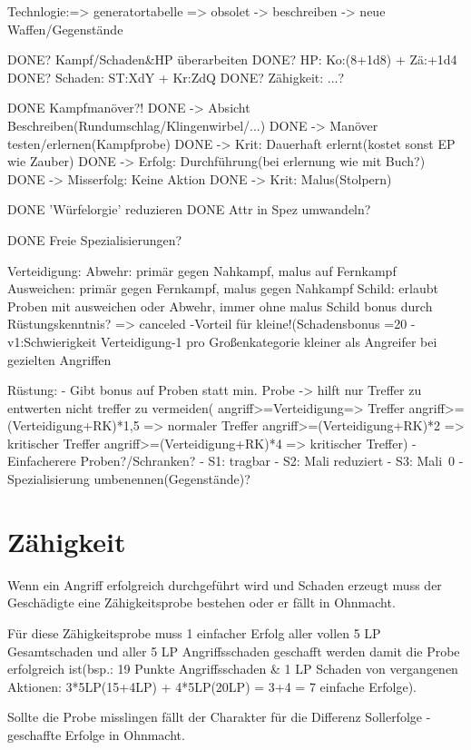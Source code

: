 Technlogie:=> generatortabelle => obsolet
	-> beschreiben
	-> neue Waffen/Gegenstände
	

DONE? Kampf/Schaden&HP überarbeiten
DONE? 	HP: Ko:(8+1d8) + Zä:+1d4
DONE? 	Schaden: ST:XdY + Kr:ZdQ
DONE? 	Zähigkeit: ...?

DONE Kampfmanöver?!
DONE 	-> Absicht Beschreiben(Rundumschlag/Klingenwirbel/...)
DONE 	-> Manöver testen/erlernen(Kampfprobe)
DONE 		-> Krit: Dauerhaft erlernt(kostet sonst EP wie Zauber)
DONE 		-> Erfolg: Durchführung(bei erlernung wie mit Buch?)
DONE 		-> Misserfolg: Keine Aktion
DONE 		-> Krit: Malus(Stolpern)

DONE 'Würfelorgie' reduzieren
DONE 	Attr in Spez umwandeln?

DONE Freie Spezialisierungen?

Verteidigung:
	Abwehr: primär gegen Nahkampf, malus auf Fernkampf
	Ausweichen: primär gegen Fernkampf, malus gegen Nahkampf
	Schild: erlaubt Proben mit ausweichen oder Abwehr, immer ohne malus
	Schild bonus durch Rüstungskenntnis? => canceled
	-Vorteil für kleine!(Schadensbonus =20%
			-v1:Schwierigkeit Verteidigung-1 pro Großenkategorie kleiner als Angreifer bei gezielten Angriffen

Rüstung:
	- Gibt bonus auf Proben statt min. Probe
		-> hilft nur Treffer zu entwerten nicht treffer zu vermeiden(
			angriff>=Verteidigung=> Treffer
			angriff>=(Verteidigung+RK)*1,5 => normaler Treffer
			angriff>=(Verteidigung+RK)*2 => kritischer Treffer
			angriff>=(Verteidigung+RK)*4 => kritischer Treffer)
	- Einfacherere Proben?/Schranken?
		- S1: tragbar
		- S2: Mali reduziert
		- S3: Mali~0
	- Spezialisierung umbenennen(Gegenstände)?
	

\section{Zähigkeit}
Wenn ein Angriff erfolgreich durchgeführt wird und Schaden erzeugt muss der Geschädigte eine Zähigkeitsprobe bestehen oder er fällt in Ohnmacht.

Für diese Zähigkeitsprobe muss 1 einfacher Erfolg aller vollen 5 LP Gesamtschaden und aller 5 LP Angriffsschaden geschafft werden damit die Probe erfolgreich ist(bsp.: 19 Punkte Angriffsschaden \& 1 LP Schaden von vergangenen Aktionen: 3*5LP(15+4LP) + 4*5LP(20LP) = 3+4 = 7 einfache Erfolge).

Sollte die Probe misslingen fällt der Charakter für die Differenz Sollerfolge - geschaffte Erfolge in Ohnmacht.





